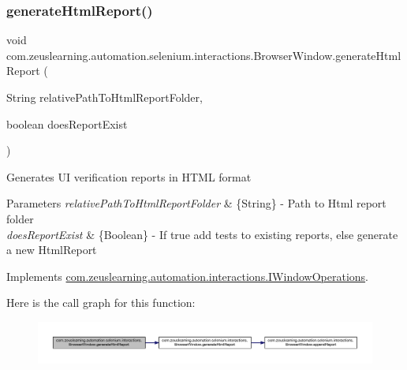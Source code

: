 \subsubsection{\texorpdfstring{generate\+Html\+Report()}{generateHtmlReport()}\hspace{0.1cm}{\footnotesize\ttfamily [2/2]}}
{\footnotesize\ttfamily void com.\+zeuslearning.\+automation.\+selenium.\+interactions.\+Browser\+Window.\+generate\+Html\+Report (\begin{DoxyParamCaption}\item[{String}]{relative\+Path\+To\+Html\+Report\+Folder,  }\item[{boolean}]{does\+Report\+Exist }\end{DoxyParamCaption})\hspace{0.3cm}{\ttfamily [inline]}}

Generates UI verification reports in H\+T\+ML format


\begin{DoxyParams}{Parameters}
{\em relative\+Path\+To\+Html\+Report\+Folder} & \{String\} -\/ Path to Html report folder \\
\hline
{\em does\+Report\+Exist} & \{Boolean\} -\/ If {\ttfamily true} add tests to existing reports, else generate a new Html\+Report \\
\hline
\end{DoxyParams}


Implements \hyperlink{interfacecom_1_1zeuslearning_1_1automation_1_1interactions_1_1IWindowOperations_af2edf0ff09f4c8e40ed4f2f42ff00582}{com.\+zeuslearning.\+automation.\+interactions.\+I\+Window\+Operations}.

Here is the call graph for this function\+:
\nopagebreak
\begin{figure}[H]
\begin{center}
\leavevmode
\includegraphics[width=350pt]{d8/d87/classcom_1_1zeuslearning_1_1automation_1_1selenium_1_1interactions_1_1BrowserWindow_a0b6b11b00f45f4b78455962d6b33b33f_cgraph}
\end{center}
\end{figure}
\hypertarget{classcom_1_1zeuslearning_1_1automation_1_1selenium_1_1interactions_1_1BrowserWindow_a018371a31ff443e6e1c192862b1a8a29}{}\label{classcom_1_1zeuslearning_1_1automation_1_1selenium_1_1interactions_1_1BrowserWindow_a018371a31ff443e6e1c192862b1a8a29} 
